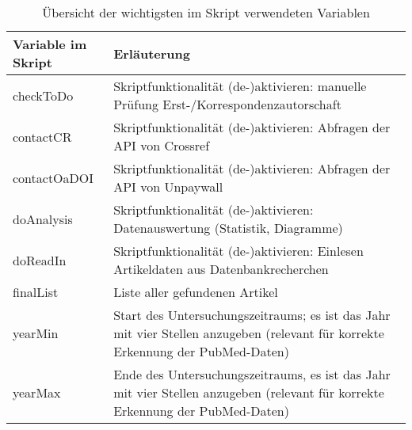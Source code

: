 \begin{appendices}
\begin{table}[h]
\caption{Übersicht der wichtigsten im Skript verwendeten Variablen}
    \begin{tabularx}{1\textwidth}{p{5cm}p{9cm}}
    \toprule
     Variable im Skript & Erläuterung \\
     \midrule
checkToDo & Skriptfunktionalität (de-)aktivieren: manuelle Prüfung Erst-/Korrespondenzautorschaft\\
contactCR & Skriptfunktionalität (de-)aktivieren: Abfragen der API von Crossref \\
contactOaDOI & Skriptfunktionalität (de-)aktivieren: Abfragen der API von Unpaywall \\
doAnalysis & Skriptfunktionalität (de-)aktivieren: Datenauswertung (Statistik, Diagramme)\\
doReadIn & Skriptfunktionalität (de-)aktivieren: Einlesen Artikeldaten aus Datenbankrecherchen\\
finalList & Liste aller gefundenen Artikel\\
yearMin & Start des Untersuchungszeitraums; es ist das Jahr mit vier Stellen anzugeben (relevant für korrekte Erkennung der PubMed-Daten)\\
yearMax & Ende des Untersuchungszeitraums, es ist das Jahr  mit vier Stellen anzugeben (relevant für korrekte Erkennung der PubMed-Daten)\\
    \bottomrule
    \end{tabularx}
\end{table}


\end{appendices}

